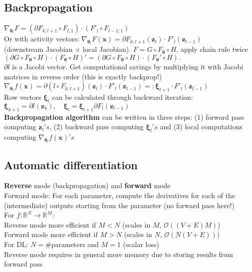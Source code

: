 \subsection*{Backpropagation}
$\nabla_{\pmb\theta_l}F=(\partial F_{k:l+1}\circ F_{l:1})\cdot(F'_l\circ F_{l-1:1})$\\
Or with activity vectors: $\nabla_{\pmb\theta_l}F(\mathbf x)=\partial F_{k:l+1}(\mathbf z_l)\cdot F'_l(\mathbf z_{l-1})$\\(downstream Jacobian $\times$ local Jacobian). $F=G\circ F_{\pmb\theta} \circ H$, apply chain rule twice $(\partial G \circ F_{\pmb\theta}\circ H)\cdot (F_{\pmb\theta}\circ H)' = (\partial G \circ F_{\pmb\theta}\circ H)\cdot (F_{\pmb\theta}'\circ H).$\\
$\partial l$ is a Jacobi vector. Get computational savings by multiplying it with Jacobi matrices in reverse order (this is exactly backprop!)\\
$\nabla_{\pmb\theta_l}f(\mathbf x)=\partial(l\circ F_{k:l+1})(\mathbf z_l)\cdot F'_l(\mathbf z_{l-1})=:\pmb\xi_{l+1}\cdot F'_l(\mathbf z_{l-1})$\\
Row vectors $\pmb\xi_{l}$ can be calculated through backward iteration: \\
$\pmb\xi_{k+1}=\partial l(\mathbf z_k), \quad \pmb\xi_{l}=\pmb\xi_{l+1}\partial F_l(\mathbf z_{l-1})$\\
\textbf{Backpropagation algorithm} can be written in three steps: (1) forward pass computing $\mathbf z_l's$, (2) backward pass computing $\pmb\xi_{l}'s$ and (3) local computations computing $\nabla_{\pmb\theta_l}f(\mathbf x)'s$
\subsection*{Automatic differentiation}
\textbf{Reverse} mode (backpropagation) and \textbf{forward} mode\\
Forward mode: For each parameter, compute the derivatives for each of the (intermediate) outputs starting from the parameter (no forward pass here!)\\
For $f:\mathbb R^N\rightarrow\mathbb R^M$:\\
Reverse mode more efficient if $M<N$ (scales in $M$, $\mathcal O((V+E)M)$)\\
Forward mode more efficient if $M>N$ (scales in $N$, $\mathcal O(N(V+E))$)\\
For DL: $N=\#\text{parameters}$ and $M=1$ (scalar loss)\\
Reverse mode requires in general more memory due to storing results from forward pass
